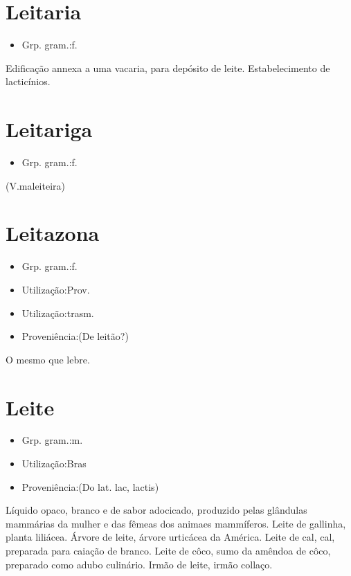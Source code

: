 \section{Leitaria}
\begin{itemize}
\item {Grp. gram.:f.}
\end{itemize}
Edificação annexa a uma vacaria, para depósito de leite.
Estabelecimento de lacticínios.
\section{Leitariga}
\begin{itemize}
\item {Grp. gram.:f.}
\end{itemize}
(V.maleiteira)
\section{Leitazona}
\begin{itemize}
\item {Grp. gram.:f.}
\end{itemize}
\begin{itemize}
\item {Utilização:Prov.}
\end{itemize}
\begin{itemize}
\item {Utilização:trasm.}
\end{itemize}
\begin{itemize}
\item {Proveniência:(De \textunderscore leitão\textunderscore ?)}
\end{itemize}
O mesmo que \textunderscore lebre\textunderscore .
\section{Leite}
\begin{itemize}
\item {Grp. gram.:m.}
\end{itemize}
\begin{itemize}
\item {Utilização:Bras}
\end{itemize}
\begin{itemize}
\item {Proveniência:(Do lat. \textunderscore lac\textunderscore , \textunderscore lactis\textunderscore )}
\end{itemize}
Líquido opaco, branco e de sabor adocicado, produzido pelas glândulas mammárias da mulher e das fêmeas dos animaes mammíferos.
\textunderscore Leite de gallinha\textunderscore , planta liliácea.
\textunderscore Árvore de leite\textunderscore , árvore urticácea da América.
\textunderscore Leite de cal\textunderscore , cal, preparada para caiação de branco.
\textunderscore Leite de côco\textunderscore , sumo da amêndoa de côco, preparado como adubo culinário.
\textunderscore Irmão de leite\textunderscore , irmão collaço.
